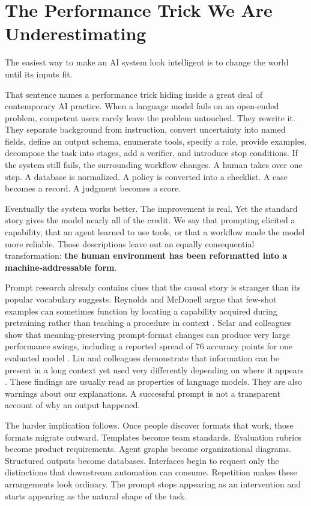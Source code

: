\documentclass[11pt]{article}
\newcommand{\strong}[1]{\textbf{#1}}
\begin{document}
\section{The Performance Trick We Are Underestimating}

The easiest way to make an AI system look intelligent is to change the world until its inputs fit.

That sentence names a performance trick hiding inside a great deal of contemporary AI practice. When a language model fails on an open-ended problem, competent users rarely leave the problem untouched. They rewrite it. They separate background from instruction, convert uncertainty into named fields, define an output schema, enumerate tools, specify a role, provide examples, decompose the task into stages, add a verifier, and introduce stop conditions. If the system still fails, the surrounding workflow changes. A human takes over one step. A database is normalized. A policy is converted into a checklist. A case becomes a record. A judgment becomes a score.

Eventually the system works better. The improvement is real. Yet the standard story gives the model nearly all of the credit. We say that prompting elicited a capability, that an agent learned to use tools, or that a workflow made the model more reliable. Those descriptions leave out an equally consequential transformation: \strong{the human environment has been reformatted into a machine-addressable form}.

Prompt research already contains clues that the causal story is stranger than its popular vocabulary suggests. Reynolds and McDonell argue that few-shot examples can sometimes function by locating a capability acquired during pretraining rather than teaching a procedure in context \citep{reynolds2021prompt}. Sclar and colleagues show that meaning-preserving prompt-format changes can produce very large performance swings, including a reported spread of 76 accuracy points for one evaluated model \citep{sclar2024format}. Liu and colleagues demonstrate that information can be present in a long context yet used very differently depending on where it appears \citep{liu2024lost}. These findings are usually read as properties of language models. They are also warnings about our explanations. A successful prompt is not a transparent account of why an output happened.

The harder implication follows. Once people discover formats that work, those formats migrate outward. Templates become team standards. Evaluation rubrics become product requirements. Agent graphs become organizational diagrams. Structured outputs become databases. Interfaces begin to request only the distinctions that downstream automation can consume. Repetition makes these arrangements look ordinary. The prompt stops appearing as an intervention and starts appearing as the natural shape of the task.
\end{document}
